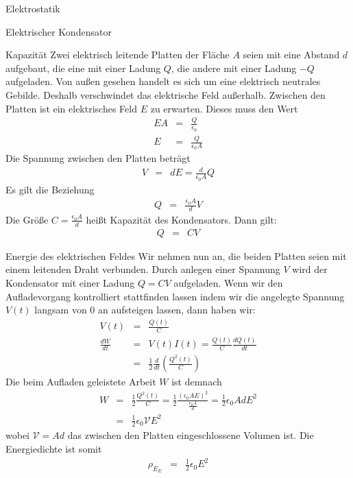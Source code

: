 \begin{chapter}{\titlestr}
\begin{section}{Elektrostatik}
\begin{subsection}{Elektrischer Kondensator}
\begin{subsubsection}{Kapazität}
Zwei elektrisch leitende Platten der Fläche $A$ seien mit eine Abstand $d$ aufgebaut, die eine mit einer Ladung $Q$, die andere mit einer Ladung $-Q$ aufgeladen. Von außen gesehen
handelt es sich um eine elektrisch neutrales Gebilde. Deshalb verschwindet das elektrische Feld außerhalb. Zwischen den Platten ist ein elektrisches Feld $E$ zu erwarten. Dieses muss den Wert
\begin{eqnarray*}
EA &=& \frac{Q}{\epsilon_0}\\
E &=& \frac{Q}{\epsilon_0 A}
\end{eqnarray*}
Die Spannung zwischen den Platten beträgt
\begin{eqnarray*}
V &=& dE = \frac{d}{\epsilon_0 A}Q
\end{eqnarray*}
Es gilt die Beziehung
\begin{eqnarray*}
Q &=& \frac{\epsilon_0 A}{d}V
\end{eqnarray*}
Die Größe $C=\frac{\epsilon_0 A}{d}$ heißt Kapazität des Kondensators. Dann gilt:
\begin{eqnarray*}
Q &=& CV
\end{eqnarray*}

\end{subsubsection}

\begin{subsubsection}{Energie des elektrischen Feldes}
Wir nehmen nun an, die beiden Platten seien mit einem leitenden Draht verbunden. Durch anlegen einer Spannung $V$ wird der Kondensator mit einer Ladung $Q=CV$ aufgeladen.
Wenn wir den Aufladevorgang kontrolliert stattfinden lassen indem wir die angelegte Spannung $V(t)$ langsam von 0 an aufsteigen lassen, dann haben wir:
\begin{eqnarray*}
V(t) &=& \frac{Q(t)}{C}\\
\frac{dW}{dt} &=& V(t)I(t) =  \frac{Q(t)}{C}\frac{dQ(t)}{dt}\\
&=&\frac{1}{2}\frac{d}{dt}\left(\frac{Q^2(t)}{C}\right)
\end{eqnarray*}
Die beim Aufladen geleistete Arbeit $W$ ist demnach
\begin{eqnarray*}
W &=&\frac{1}{2}\frac{Q^2(t)}{C}=\frac{1}{2}\frac{(\epsilon_0AE)^2}{\frac{\epsilon_0 A}{d}}=\frac{1}{2}\epsilon_0AdE^2\\
&=&\frac{1}{2}\epsilon_0\mathcal{V}E^2
\end{eqnarray*}
wobei $\mathcal{V}=Ad$ das zwischen den Platten eingeschlossene Volumen ist. Die Energiedichte ist somit
\begin{eqnarray}
\label{E_energyDensity}
\rho_{E_E}&=&\frac{1}{2}\epsilon_0E^2
\end{eqnarray}


\end{subsubsection}
\end{subsection}
\end{section}
\end{chapter}
